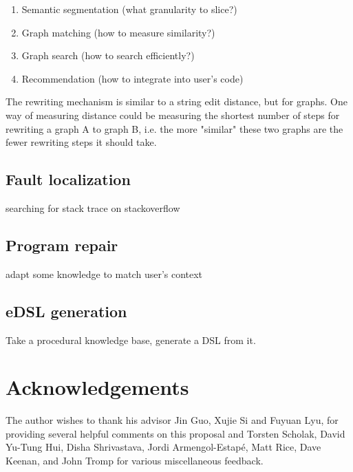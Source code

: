\documentclass[11pt]{article}
\begin{document}
    \begin{enumerate}
        \item Semantic segmentation (what granularity to slice?)
        \item Graph matching (how to measure similarity?)
        \item Graph search (how to search efficiently?)
        \item Recommendation (how to integrate into user's code)
    \end{enumerate}

    The rewriting mechanism is similar to a string edit distance, but for graphs. One way of measuring distance could be measuring the shortest number of steps for rewriting a graph A to graph B, i.e. the more "similar" these two graphs are the fewer rewriting steps it should take.

    \subsection{Fault localization}

    searching for stack trace on stackoverflow

    \subsection{Program repair}

    adapt some knowledge to match user's context

    \subsection{eDSL generation}

    Take a procedural knowledge base, generate a DSL from it.

    \pagebreak \section{Acknowledgements}

    The author wishes to thank his advisor Jin Guo, Xujie Si and Fuyuan Lyu, for providing several helpful comments on this proposal and Torsten Scholak, David Yu-Tung Hui, Disha Shrivastava, Jordi Armengol-Estap\'e, Matt Rice, Dave Keenan, and John Tromp for various miscellaneous feedback.

    
    
\end{document}
